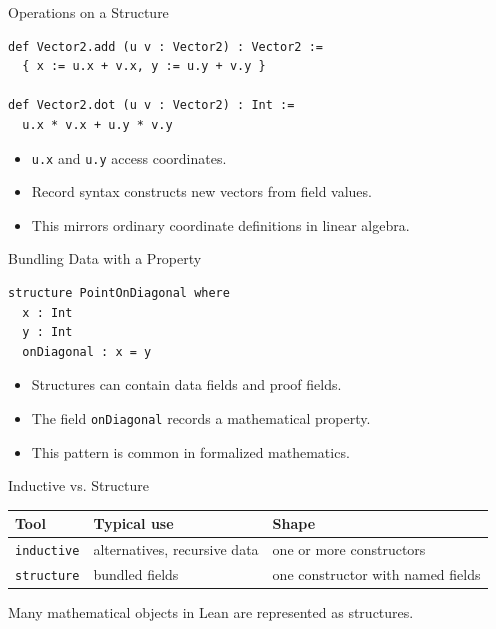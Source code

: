 ﻿\documentclass[aspectratio=169,11pt]{beamer}
\begin{document}
\begin{frame}[fragile]{Operations on a Structure}
  \begin{lstlisting}
def Vector2.add (u v : Vector2) : Vector2 :=
  { x := u.x + v.x, y := u.y + v.y }

def Vector2.dot (u v : Vector2) : Int :=
  u.x * v.x + u.y * v.y
  \end{lstlisting}

  \begin{itemize}
    \item \texttt{u.x} and \texttt{u.y} access coordinates.
    \item Record syntax constructs new vectors from field values.
    \item This mirrors ordinary coordinate definitions in linear algebra.
  \end{itemize}
\end{frame}

\begin{frame}[fragile]{Bundling Data with a Property}
  \begin{lstlisting}
structure PointOnDiagonal where
  x : Int
  y : Int
  onDiagonal : x = y
  \end{lstlisting}

  \begin{itemize}
    \item Structures can contain data fields and proof fields.
    \item The field \texttt{onDiagonal} records a mathematical property.
    \item This pattern is common in formalized mathematics.
  \end{itemize}
\end{frame}

\begin{frame}{Inductive vs. Structure}
  \begin{tabular}{@{}lll@{}}
    \toprule
    Tool & Typical use & Shape \\
    \midrule
    \texttt{inductive} & alternatives, recursive data & one or more constructors \\
    \texttt{structure} & bundled fields & one constructor with named fields \\
    \bottomrule
  \end{tabular}

  \vspace{1em}

  Many mathematical objects in Lean are represented as structures.
\end{frame}
\end{document}
